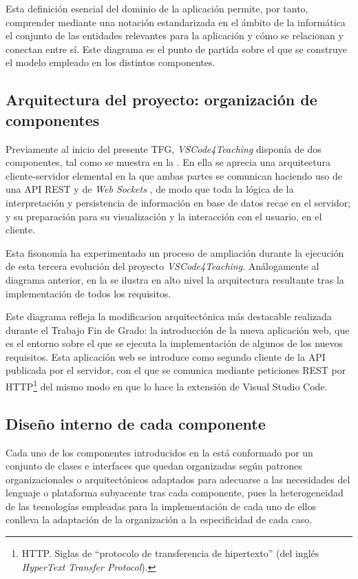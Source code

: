 Esta definición esencial del dominio de la aplicación permite, por tanto, comprender mediante una notación estandarizada en el ámbito de la informática el conjunto de las entidades relevantes para la aplicación y cómo se relacionan y conectan entre sí. Este diagrama es el punto de partida sobre el que se construye el modelo empleado en los distintos componentes.

\subsection{Arquitectura del proyecto: organización de componentes}
\label{subsec:arq}
Previamente al inicio del presente TFG, \textit{VSCode4Teaching} disponía de dos componentes, tal como se muestra en la . En ella se aprecia una arquitectura cliente-servidor elemental en la que ambas partes se comunican haciendo uso de una API REST y de \textit{Web Sockets} \cite{IONOSWebSocket}, de modo que toda la lógica de la interpretación y persistencia de información en base de datos recae en el servidor; y su preparación para su visualización y la interacción con el usuario, en el cliente.



Esta fisonomía ha experimentado un proceso de ampliación durante la ejecución de esta tercera evolución del proyecto \textit{VSCode4Teaching}. Análogamente al diagrama anterior, en la  se ilustra en alto nivel la arquitectura resultante tras la implementación de todos los requisitos.

Este diagrama refleja la modificacion arquitectónica más destacable realizada durante el Trabajo Fin de Grado: la introducción de la nueva aplicación web, que es el entorno sobre el que se ejecuta la implementación de algunos de los nuevos requisitos. Esta aplicación web se introduce como segundo cliente de la API publicada por el servidor, con el que se comunica mediante peticiones REST por HTTP\footnote{HTTP. Siglas de ``protocolo de transferencia de hipertexto'' (del inglés \textit{HyperText Transfer Protocol}).} del mismo modo en que lo hace la extensión de Visual Studio Code.



\subsection{Diseño interno de cada componente}
\label{subsec:diseño}
Cada uno de los componentes introducidos en la  está conformado por un conjunto de clases e interfaces que quedan organizadas según patrones organizacionales o arquitectónicos adaptados para adecuarse a las necesidades del lenguaje o plataforma subyacente tras cada componente, pues la heterogeneidad de las tecnologías empleadas para la implementación de cada uno de ellos conlleva la adaptación de la organización a la especificidad de cada caso.

